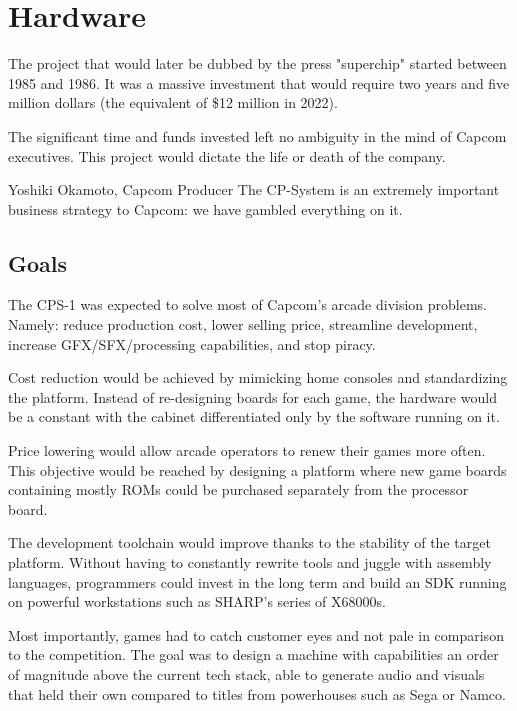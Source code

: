 \chapter{Hardware}
The project that would later be dubbed by the press "superchip"\cite{tgm198906} started between 1985 and 1986. It was a massive investment that would require two years and five million dollars\cite{becareful} (the equivalent of \$12 million in 2022).

The significant time and funds invested left no ambiguity in the mind of Capcom executives. This project would dictate the life or death of the company.

\begin{q}{Yoshiki Okamoto, Capcom Producer\cite{gamest38}}
The CP-System is an extremely important business strategy to Capcom: we have gambled everything on it.
\end{q}

\section{Goals}
The CPS-1 was expected to solve most of Capcom's arcade division problems. Namely: reduce production cost, lower selling price, streamline development, increase GFX/SFX/processing capabilities, and stop piracy. 

Cost reduction would be achieved by mimicking home consoles and standardizing the platform. Instead of re-designing boards for each game, the hardware would be a constant with the cabinet differentiated only by the software running on it.

Price lowering would allow arcade operators to renew their games more often. This objective would be reached by designing a platform where new game boards containing mostly ROMs could be purchased separately from the processor board.

The development toolchain would improve thanks to the stability of the target platform. Without having to constantly rewrite tools and juggle with assembly languages, programmers could invest in the long term and build an SDK running on powerful workstations such as SHARP's series of X68000s.

Most importantly, games had to catch customer eyes and not pale in comparison to the competition. The goal was to design a machine with capabilities an order of magnitude above the current tech stack, able to generate audio and visuals that held their own compared to titles from powerhouses such as Sega or Namco.

